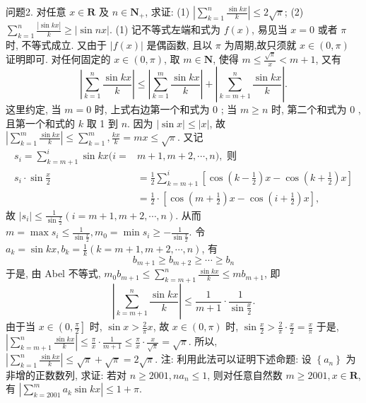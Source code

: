 问题2. 对任意 $x \in \mathbf{R}$ 及 $n \in \mathbf{N}_{+}$, 求证:
(1) $\left|\sum_{k=1}^n \frac{\sin k x}{k}\right| \leqslant 2 \sqrt{\pi}$;
(2) $\sum_{k=1}^n \frac{|\sin k x|}{k} \geqslant|\sin n x|$.
(1) 记不等式左端和式为 $f(x)$, 易见当 $x=0$ 或者 $\pi$ 时, 不等式成立.
又由于 $|f(x)|$ 是偶函数, 且以 $\pi$ 为周期,故只须就 $x \in(0, \pi)$ 证明即可.
对任何固定的 $x \in(0, \pi)$, 取 $m \in \mathbf{N}$, 使得 $m \leqslant \frac{\sqrt{\pi}}{x}<m+1$, 又有
$$
\left|\sum_{k=1}^n \frac{\sin k x}{k}\right| \leqslant\left|\sum_{k=1}^m \frac{\sin k x}{k}\right|+\left|\sum_{k=m+1}^n \frac{\sin k x}{k}\right| .
$$
这里约定, 当 $m=0$ 时, 上式右边第一个和式为 0 ; 当 $m \geqslant n$ 时, 第二个和式为 0 ,且第一个和式的 $k$ 取 1 到 $n$.
因为 $|\sin x| \leqslant|x|$, 故 $\left|\sum_{k=1}^m \frac{\sin k x}{k}\right| \leqslant \sum_{k=1}^m, \frac{k x}{k}=m x \leqslant \sqrt{\pi}$. 又记
$$
\begin{aligned}
s_i=\sum_{k=m+1}^i \sin k x(i= & m+1, m+2, \cdots, n), \text { 则 } \\
s_i \cdot \sin \frac{x}{2} & =\frac{1}{2} \sum_{k=m+1}^i\left[\cos \left(k-\frac{1}{2}\right) x-\cos \left(k+\frac{1}{2}\right) x\right] \\
& =\frac{1}{2} \cdot\left[\cos \left(m+\frac{1}{2}\right) x-\cos \left(i+\frac{1}{2}\right) x\right],
\end{aligned}
$$
故 $\left|s_i\right| \leqslant \frac{1}{\sin \frac{x}{2}}(i=m+1, m+2, \cdots, n)$.
从而 $m=\max s_i \leqslant \frac{1}{\sin \frac{x}{2}}, m_0=\min s_i \geqslant-\frac{1}{\sin \frac{x}{2}}$.
令 $a_k=\sin k x, b_k=\frac{1}{k}(k=m+1, m+2, \cdots, n)$, 有
$$
b_{m+1} \geqslant b_{m+2} \geqslant \cdots \geqslant b_n
$$
于是, 由 Abel 不等式, $m_0 b_{m+1} \leqslant \sum_{k=m+1}^n \frac{\sin k x}{k} \leqslant m b_{m+1}$, 即
$$
\left|\sum_{k=m+1}^n \frac{\sin k x}{k}\right| \leqslant \frac{1}{m+1} \cdot \frac{1}{\sin \frac{x}{2}} .
$$
由于当 $x \in\left(0, \frac{\pi}{2}\right]$ 时, $\sin x>\frac{2}{\pi} x$, 故 $x \in(0, \pi)$ 时, $\sin \frac{x}{2}>\frac{2}{\pi} \cdot \frac{x}{2}= \frac{x}{\pi}$
于是, $\left|\sum_{k=m+1}^n \frac{\sin k x}{k}\right| \leqslant \frac{\pi}{x} \cdot \frac{1}{m+1} \leqslant \frac{\pi}{x} \cdot \frac{x}{\sqrt{\pi}}=\sqrt{\pi}$.
所以, $\left|\sum_{k=1}^n \frac{\sin k x}{k}\right| \leqslant \sqrt{\pi}+\sqrt{\pi}=2 \sqrt{\pi}$.
注: 利用此法可以证明下述命题:
设 $\left\{a_n\right\}$ 为非增的正数数列, 求证: 若对 $n \geqslant 2001, n a_n \leqslant 1$, 则对任意自然数 $m \geqslant 2001, x \in \mathbf{R}$, 有 $\left|\sum_{k=2001}^m a_k \sin k x\right| \leqslant 1+\pi$.
